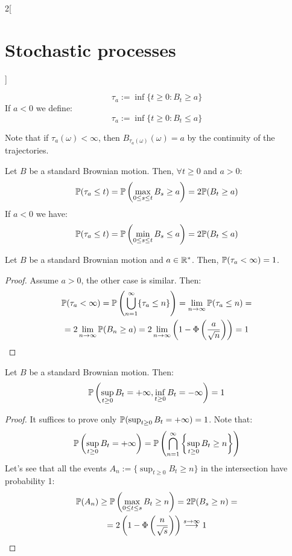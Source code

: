 \documentclass[../../../main_math.tex]{subfiles}
\begin{document}
\begin{multicols}{2}[\section{Stochastic processes}]
\begin{definition}
    $$
      \tau_a:=\inf\{t\geq 0:B_t\geq a\}
    $$
    If $a<0$ we define: $$\tau_a:=\inf\{t\geq 0:B_t\leq a\}$$
  \end{definition}
  \begin{remark}
    Note that if $\tau_a(\omega)<\infty$, then $B_{\tau_a(\omega)}(\omega)=a$ by the continuity of the trajectories.
  \end{remark}
  \begin{lemma}\label{SP:distrTauA}
    Let $B$ be a standard Brownian motion. Then, $\forall t\geq 0$ and $a>0$:
    $$
      \mathbb{P}(\tau_a\leq t)=\mathbb{P}\left(\max_{0\leq s\leq t}B_s\geq a\right)=2\mathbb{P}(B_t\geq a)
    $$
    If $a<0$ we have:
    $$
      \mathbb{P}(\tau_a\leq t)=\mathbb{P}\left(\min_{0\leq s\leq t}B_s\leq a\right)=2\mathbb{P}(B_t\leq a)
    $$
  \end{lemma}
  \begin{corollary}
    Let $B$ be a standard Brownian motion and $a\in\mathbb{R}^*$. Then, $\mathbb{P}(\tau_a<\infty)=1$.
  \end{corollary}
  \begin{proof}
    Assume $a>0$, the other case is similar. Then:
    \begin{multline*}
      \mathbb{P}(\tau_a<\infty)=\mathbb{P}\left(\bigcup_{n=1}^\infty\{\tau_a\leq n\}\right)=\lim_{n\to\infty}\mathbb{P}(\tau_a\leq n)=\\
      =2\lim_{n\to\infty}\mathbb{P}(B_n\geq a)=2\lim_{n\to\infty}\left(1-\Phi\left(\frac{a}{\sqrt{n}}\right)\right)=1
    \end{multline*}
  \end{proof}
  \begin{proposition}
    Let $B$ be a standard Brownian motion. Then:
    $$
      \mathbb{P}\left(\sup_{t\geq 0}B_t=+\infty,\inf_{t\geq 0}B_t=-\infty\right)=1
    $$
  \end{proposition}
  \begin{proof}
    It suffices to prove only $\mathbb{P}(\sup_{t\geq 0}B_t=+\infty)=1$. Note that:
    $$
      \mathbb{P}\left(\sup_{t\geq 0}B_t=+\infty\right)=\mathbb{P}\left(\bigcap_{n=1}^\infty\left\{\sup_{t\geq 0}B_t\geq n\right\}\right)
    $$
    Let's see that all the events $A_n:=\{\sup_{t\geq 0}B_t\geq n\}$ in the intersection have probability 1:
    \begin{multline*}
      \mathbb{P}(A_n)\geq \mathbb{P}\left(\max_{0\leq t\leq s} B_t\geq n\right)=2\mathbb{P}(B_s\geq n)=\\=2\left(1-\Phi\left(\frac{n}{\sqrt{s}}\right)\right)\overset{s\to\infty}{\longrightarrow} 1
    \end{multline*}

\end{proof}
\end{multicols}
\end{document}
